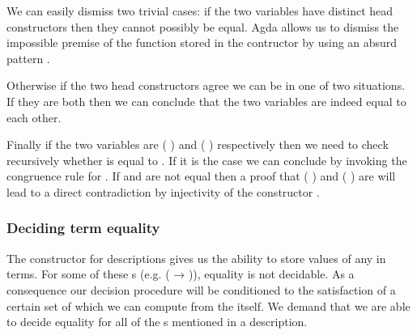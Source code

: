 \begin{agdasnippet}
\end{agdasnippet}

We can easily dismiss two trivial cases: if the two variables have distinct
head constructors then they cannot possibly be equal. Agda allows us to
dismiss the impossible premise of the function stored in the 
contructor by using an absurd pattern \AS{()}.

\begin{agdasnippet}
\end{agdasnippet}

Otherwise if the two head constructors agree we can be in one of two
situations. If they are both  then we can conclude that the two
variables are indeed equal to each other.

\begin{agdasnippet}
\end{agdasnippet}

Finally if the two variables are {( )} and {( )}
respectively then we need to check recursively whether  is equal
to . If it is the case we can conclude by invoking the congruence
rule for . If  and  are not equal then a proof that
{( )} and {( )} are will lead to a direct
contradiction by injectivity of the constructor .

\begin{agdasnippet}
\end{agdasnippet}

\subsubsection{Deciding term equality}

The constructor  for descriptions gives us the ability to store
values of any  in terms. For some of these s (e.g.
{( → )}), equality is not decidable. As a consequence
our decision procedure will be conditioned to the satisfaction of a
certain set of  which we can compute from the 
itself. We demand that we are
able to decide equality for all of the s mentioned in a description.

\begin{agdasnippet}
\end{agdasnippet}

